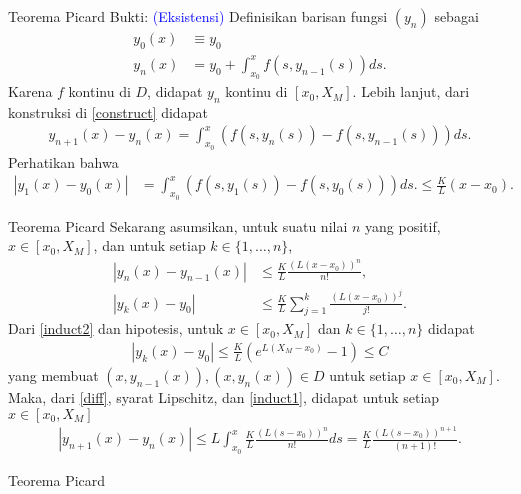 \documentclass[xcolor={dvipsnames}, 9pt]{beamer}
\renewcommand{\emph}[1]{\textcolor{Blue}{#1}}
\begin{document}
    \begin{frame}{Teorema Picard}
        Bukti: \emph{(Eksistensi)} Definisikan barisan fungsi $(y_n)$ sebagai
        \begin{align}\label{construct}
            y_0(x) &\equiv y_0 \nonumber \\
            y_n(x) &= y_0 + \int_{x_0}^x f(s,y_{n-1}(s))ds.
        \end{align}
        Karena $f$ kontinu di $D$, didapat $y_n$ kontinu di $[x_0,X_M]$. Lebih lanjut, dari konstruksi di \eqref{construct} didapat
        \begin{align}\label{diff}
            y_{n+1}(x)-y_n(x) = \int_{x_0}^x (f(s,y_n(s))-f(s,y_{n-1}(s))) ds.
        \end{align}
        Perhatikan bahwa
        \begin{align*}
            |y_1(x)-y_0(x)| &= \int_{x_0}^x (f(s,y_1(s))-f(s,y_0(s))) ds. \leq \frac{K}{L}(x-x_0).
        \end{align*}
    \end{frame}
    \begin{frame}{Teorema Picard}
        Sekarang asumsikan, untuk suatu nilai $n$ yang positif, $x\in [x_0,X_M]$, dan untuk setiap $k\in\{1,\dots,n\}$,
        \begin{align}
            |y_n(x)-y_{n-1}(x)| &\leq \frac{K}{L}\frac{(L(x-x_0))^n}{n!}, \label{induct1} \\ 
            |y_k(x)-y_0| &\leq \frac{K}{L} \sum_{j=1}^k \frac{(L(x-x_0))^j}{j!}. \label{induct2}
        \end{align}
        Dari \eqref{induct2} dan hipotesis, untuk $x\in[x_0,X_M]$ dan $k\in\{1,\dots,n\}$ didapat
        \begin{align*}
            |y_k(x)-y_0| \leq \frac{K}{L}\left(e^{L(X_M-x_0)}-1\right)\leq C
        \end{align*}
        yang membuat $(x,y_{n-1}(x)),(x,y_n(x))\in D$ untuk setiap $x\in[x_0,X_M]$. Maka, dari \eqref{diff}, syarat Lipschitz, dan \eqref{induct1}, didapat untuk setiap $x\in[x_0,X_M]$
        \begin{align}\label{induct3}
            |y_{n+1}(x)-y_n(x)| \leq L\int_{x_0}^x \frac{K}{L}\frac{(L(s-x_0))^n}{n!}ds = \frac{K}{L}\frac{(L(s-x_0))^{n+1}}{(n+1)!}.
        \end{align}
    \end{frame}
    \begin{frame}{Teorema Picard}
        
    \end{frame}
\end{document}

